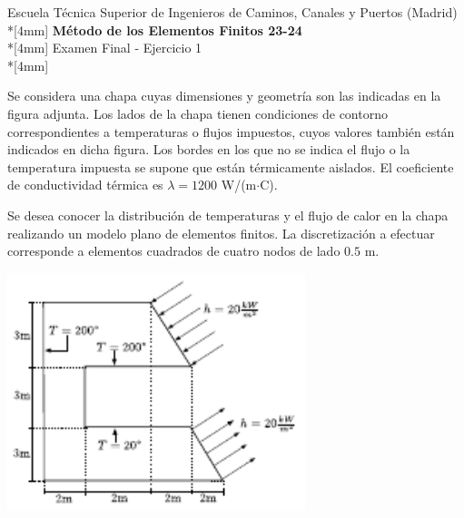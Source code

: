 \documentclass[a4paper,12pt]{article}
\begin{document}
\mbox{}\vspace*{-45mm}

{\centering
{\small\sc Escuela Técnica Superior de Ingenieros de Caminos, Canales y
Puertos (Madrid)}\\*[4mm]
{\Large\bf Método de los Elementos Finitos 23-24}\\*[4mm]
Examen Final - Ejercicio 1 \\*[4mm]
}

\vspace{3mm}


Se considera una chapa cuyas dimensiones y geometría son las indicadas
en la figura adjunta. Los lados de la chapa tienen condiciones de contorno 
correspondientes a temperaturas o flujos impuestos, cuyos valores
también están indicados en dicha figura. Los bordes en los que no se indica
el flujo o la temperatura impuesta se supone que están térmicamente aislados.
El coeficiente de conductividad térmica es $\lambda=1200$ W/(m$\cdot$C).

Se desea conocer la distribución de temperaturas y el flujo de calor en la
chapa realizando un modelo plano de elementos finitos. La discretización a efectuar corresponde a elementos cuadrados de cuatro
nodos de lado $0.5$ m.

\vspace{3mm}


\begin{center}
\includegraphics[width=0.65\textwidth]{fig-cropped.pdf}
\end{center}
\end{document}
